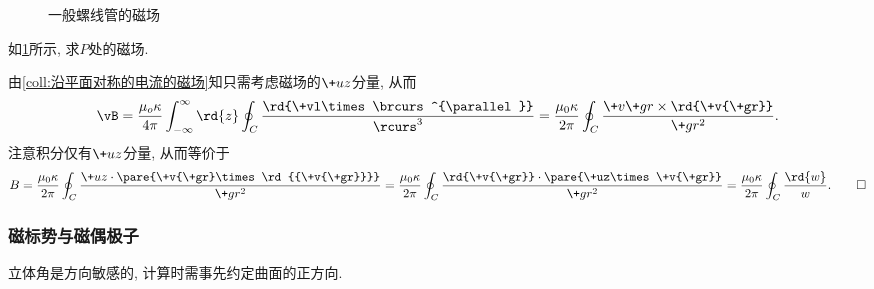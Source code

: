 \documentclass[hidelinks]{ctexart}
\begin{document}
\begin{figure}[ht]
    \centering
    \caption{一般螺线管的磁场}
    \label{fig:一般螺线管的磁场}
\end{figure}
\begin{sample}
    \begin{ex}
        如\cref{fig:一般螺线管的磁场}所示, 求$P$处的磁场.
    \end{ex}
    \begin{solution}
        由\cref{coll:沿平面对称的电流的磁场}知只需考虑磁场的$\+uz$分量, 从而
        \[ \vB = \frac{\mu_o\kappa}{4\pi}\int_{-\infty}^{\infty}\rd{z}\oint_C\frac{\rd{\+vl\times\brcurs^{\parallel}}}{\rcurs^3} = \frac{\mu_0\kappa}{2\pi}\oint_C \frac{\+v{\+gr}\times\rd{\+v{\+gr}}}{\+gr^2}. \]
        注意积分仅有$\+uz$分量, 从而等价于
        \[ B = \frac{\mu_0\kappa}{2\pi}\oint_C\frac{\+uz\cdot\pare{\+v{\+gr}\times\rd{{\+v{\+gr}}}}}{\+gr^2} = \frac{\mu_0\kappa}{2\pi} \oint_C \frac{\rd{\+v{\+gr}}\cdot\pare{\+uz\times\+v{\+gr}}}{\+gr^2} = \frac{\mu_0\kappa}{2\pi}\oint_C \frac{\rd{w}}{w}. \qedhere \]
    \end{solution}
\end{sample}


\subsubsection{磁标势与磁偶极子} %
\label{ssub:磁标势与磁偶极子}

\begin{multicols}{2}
\end{multicols}

\begin{pitfall}
    立体角是方向敏感的, 计算时需事先约定曲面的正方向.
\end{pitfall}
\end{document}
